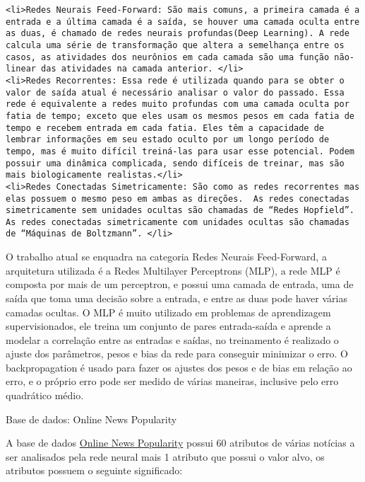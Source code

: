 \documentclass[11pt]{article}
\begin{document}
\begin{verbatim}
<li>Redes Neurais Feed-Forward: São mais comuns, a primeira camada é a entrada e a última camada é a saída, se houver uma camada oculta entre as duas, é chamado de redes neurais profundas(Deep Learning). A rede calcula uma série de transformação que altera a semelhança entre os casos, as atividades dos neurônios em cada camada são uma função não-linear das atividades na camada anterior. </li>
<li>Redes Recorrentes: Essa rede é utilizada quando para se obter o valor de saída atual é necessário analisar o valor do passado. Essa rede é equivalente a redes muito profundas com uma camada oculta por fatia de tempo; exceto que eles usam os mesmos pesos em cada fatia de tempo e recebem entrada em cada fatia. Eles têm a capacidade de lembrar informações em seu estado oculto por um longo período de tempo, mas é muito difícil treiná-las para usar esse potencial. Podem possuir uma dinâmica complicada, sendo difíceis de treinar, mas são mais biologicamente realistas.</li>
<li>Redes Conectadas Simetricamente: São como as redes recorrentes mas elas possuem o mesmo peso em ambas as direções.  As redes conectadas simetricamente sem unidades ocultas são chamadas de “Redes Hopfield”. As redes conectadas simetricamente com unidades ocultas são chamadas de “Máquinas de Boltzmann”. </li>
\end{verbatim}

O trabalho atual se enquadra na categoria Redes Neurais Feed-Forward, a
arquitetura utilizada é a Redes Multilayer Perceptrons (MLP), a rede MLP
é composta por mais de um perceptron, e possui uma camada de entrada,
uma de saída que toma uma decisão sobre a entrada, e entre as duas pode
haver várias camadas ocultas. O MLP é muito utilizado em problemas de
aprendizagem supervisionados, ele treina um conjunto de pares
entrada-saída e aprende a modelar a correlação entre as entradas e
saídas, no treinamento é realizado o ajuste dos parâmetros, pesos e bias
da rede para conseguir minimizar o erro. O backpropagation é usado para
fazer os ajustes dos pesos e de bias em relação ao erro, e o próprio
erro pode ser medido de várias maneiras, inclusive pelo erro quadrático
médio.

Base de dados: Online News Popularity

A base de dados
\href{http://archive.ics.uci.edu/ml/datasets/Online+News+Popularity}{Online
News Popularity} possui 60 atributos de várias notícias a ser analisados
pela rede neural mais 1 atributo que possui o valor alvo, os atributos
possuem o seguinte significado:
\end{document}
